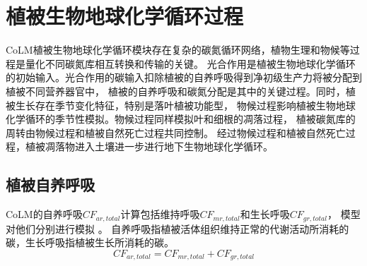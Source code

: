 \chapter{植被生物地球化学循环过程}\label{植被生物地球化学循环过程}

CoLM植被生物地球化学循环模块存在复杂的碳氮循环网络，植物生理和物候等过程是量化不同碳氮库相互转换和传输的关键。
光合作用是植被生物地球化学循环的初始输入。光合作用的碳输入扣除植被的自养呼吸得到净初级生产力将被分配到植被不同营养器官中，
植被的自养呼吸和碳氮分配是其中的关键过程。同时，植被生长存在季节变化特征，特别是落叶植被功能型，
物候过程影响植被生物地球化学循环的季节性模拟。物候过程同样模拟叶和细根的凋落过程，
植被碳氮库的周转由物候过程和植被自然死亡过程共同控制。
经过物候过程和植被自然死亡过程，植被凋落物进入土壤进一步进行地下生物地球化学循环。
\section{植被自养呼吸}\label{植被自养呼吸}

CoLM的自养呼吸$CF_{ar,total}$计算包括维持呼吸$CF_{mr,total}$和生长呼吸$CF_{gr,total}$，
模型对他们分别进行模拟 \citep{lavigne1997growth,sprugel1995respiration}。
自养呼吸指植被活体组织维持正常的代谢活动所消耗的碳，生长呼吸指植被生长所消耗的碳。
\begin{equation}
CF_{ar,total}=CF_{mr, total}+CF_{gr,total}
\end{equation}
